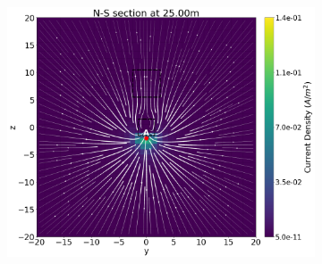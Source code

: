 \documentclass[preprint,authoryear,12pt]{elsarticle}
\begin{document}
\begin{figure}[htp]{}
\begin{center}
\begin{subfigure}{0.5\linewidth}
      \end{subfigure}\hspace{-0.9cm}
      \begin{subfigure}{0.5\linewidth}
         \label{fig:Jp_SingleLinearArray_Bottom_Blk5m_ZLocBlkCenter8m_3x3Tunnel_X}
         \includegraphics[trim=0cm 0cm 0cm 0cm, clip=true,width=\linewidth]{./figures/Fig6b.png}
      \end{subfigure}


\end{center}
\end{figure}
\end{document}
